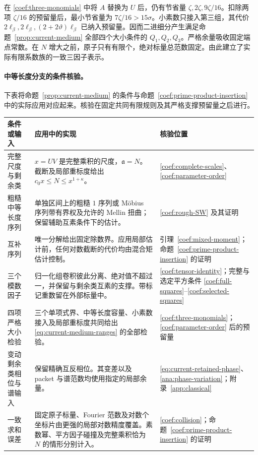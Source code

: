 在 \eqref{coef:three-monomials} 中将 $A$ 替换为 $U$ 后，仍有节省量 $\zeta,2\zeta,9\zeta/16$。扣除两项 $\zeta/16$ 的预留量后，最小节省量为 $7\zeta/16>15\sigma$。小素数只接入第三组，其代价 $2\ell_\beta,2\ell_\beta,
(2+2\vartheta)\ell_\beta$ 已纳入预留量。因而二进细分产生满足命题~\ref{prop:current-medium} 全部四个大小条件的 $Q_1,Q_2,Q_3$。严格余量吸收固定端点常数。在 $N$ 增大之前，原子只有有限个，绝对标量总范数固定。由此建立了实际有限系数族的一致三因子表示。

\hypertarget{coef:medium-checks}{}
\paragraph{中等长度分支的条件核验。}
下表将命题~\ref{prop:current-medium} 的条件与命题~\ref{coef:prime-product-insertion} 中的实际应用对应起来。核验在固定共同有限规则及其严格支撑预留量之后进行。
\begingroup
\renewcommand{\LTcaptype}{}
\small
\setlength{\tabcolsep}{4pt}
\begin{longtable}{@{}>{\raggedright\arraybackslash}p{}>{\raggedright\arraybackslash}p{}>{\raggedright\arraybackslash}p{}@{}}
\toprule
 条件或输入 & 应用中的实现 & 核验位置 \\
\midrule
\endhead
\bottomrule
\endfoot
完整尺度与剩余类 & $x=UV$ 是完整乘积的尺度，$\mathfrak a=N$。截断及局部重标度给出 $c_0x\le N\le x^{1+\kappa}$。 & \eqref{coef:complete-scales}、\eqref{coef:parameter-order}\\[3pt]
粗糙中等长度序列 & 单独区间上的粗糙 $1$ 序列或 M\"obius 序列带有界权及允许的 Mellin 扭曲；保留辅助互素条件下的估计。 & \eqref{coef:rough-SW} 及其证明\\[3pt]
互补序列 & 唯一分解给出固定除数界。应用局部估计前，任何对数截断的代价均由混合矩估计控制。 & 引理~\ref{coef:mixed-moment}；命题~\ref{coef:prime-product-insertion} 的证明\\[3pt]
三个模数因子 & 归一化组卷积彼此分离、绝对值不超过一，并保留与剩余类互素的支撑。带标记重数留在外部标量中。 & \eqref{coef:tensor-identity}；完整与选定平方条件 \eqref{coef:full-squares}--\eqref{coef:selected-squares}\\[3pt]
四项严格大小检验 & 三个单项式界、中等长度容量、小素数接入及局部重标度共同给出 \eqref{eq:current-medium-ranges} 的全部检验。 & \eqref{coef:three-monomials}；\eqref{coef:parameter-order} 后的预留量\\[3pt]
变动剩余类相位与谱输入 & 保留精确互反相位。其变差以及 packet 与谱范数均使用指定的局部余量。 & \eqref{eq:current-retained-phase}、\eqref{ana:phase-variation}；附录~\ref{app:classical}\\[3pt]
一致求和误差 & 固定原子标量、Fourier 范数及对数个坐标片由更强的局部对数精度覆盖。素数幂、平方因子碰撞及完整乘积恰为 $N$ 的情形分别计入。 & \eqref{coef:collision}；命题~\ref{coef:prime-product-insertion} 的证明\\[3pt]
\end{longtable}
\endgroup

